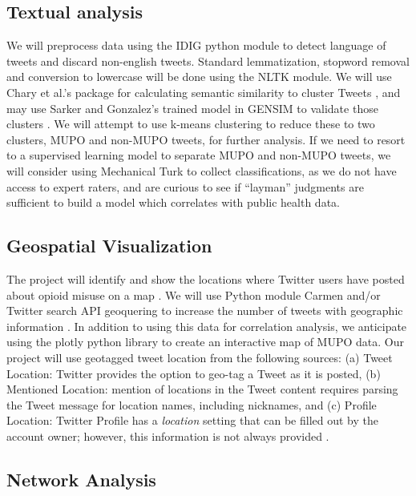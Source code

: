 \documentclass[sigconf]{acmart}
\begin{document}
\subsection{Textual analysis} 
We will preprocess data using the IDIG python module to detect language of 
tweets and discard non-english tweets. Standard lemmatization, stopword removal 
and conversion to lowercase will be done using the NLTK module. We will use 
Chary et al.’s package for calculating semantic similarity to cluster Tweets
\cite{chary17}, and may use Sarker and Gonzalez’s trained model in GENSIM 
to validate those clusters \cite{sarker16b}. We will attempt to use k-means 
clustering to reduce these to two clusters, MUPO and non-MUPO tweets, for 
further analysis. If we need to resort to a supervised learning model to 
separate MUPO and non-MUPO tweets, we will consider using Mechanical Turk to 
collect classifications, as we do not have access to expert raters, and are 
curious to see if “layman” judgments are sufficient to build a model which 
correlates with public health data. 

\subsection{Geospatial Visualization}

The project will identify and show the locations where Twitter users have 
posted about opioid misuse on a map \cite{twittergeo}. We will use Python 
module Carmen and/or Twitter search API geoquering to increase the number of 
tweets with geographic information \cite{dredze13}. In addition to using this 
data for correlation analysis, we anticipate using the plotly python library to 
create an interactive map of MUPO data. Our project will use geotagged tweet 
location from the following sources: (a) Tweet Location: Twitter provides the 
option to geo-tag a Tweet as it is posted, (b) Mentioned Location: mention of 
locations in the Tweet content requires parsing the Tweet message for location 
names, including nicknames, and (c) Profile Location: Twitter Profile has a 
\emph{location} setting that can be filled out by the account owner; however, 
this information is not always provided \cite{widener14}. 

\subsection{Network Analysis} 
\end{document}
